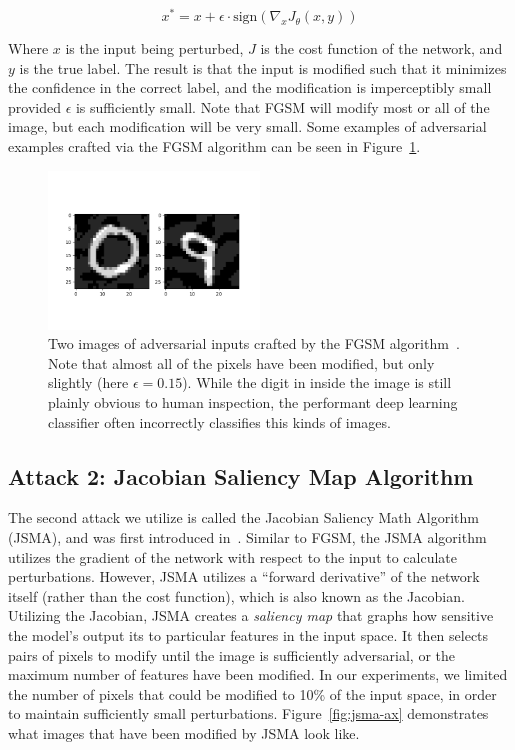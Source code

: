\documentclass{article}
\begin{document}
\begin{equation}
  x^* = x + \epsilon \cdot {\text{sign}}(\nabla_xJ_\theta(x, y))
\end{equation}

\noindent
Where $x$ is the input being perturbed, $J$ is the cost function of the network,
and $y$ is the true label. The result is that the input is modified such that it
minimizes the confidence in the correct label, and the modification is
imperceptibly small provided $\epsilon$ is sufficiently small. Note that FGSM
will modify most or all of the image, but each modification will be very small.
Some examples of adversarial examples crafted via the FGSM algorithm can be seen
in Figure~\ref{fig:fgsm-ax}.

\begin{figure}
  \includegraphics[width=0.5\textwidth]{fgsm}
  \caption{Two images of adversarial inputs crafted by the FGSM
    algorithm~\cite{goodfellow2014explaining}. Note
  that almost all of the pixels have been modified, but only slightly (here
$\epsilon = 0.15$). While the digit in inside the image is still plainly obvious
to human inspection, the performant deep learning classifier often incorrectly
classifies this kinds of images.}%
  \label{fig:fgsm-ax}
\end{figure}

\subsection{Attack 2: Jacobian Saliency Map Algorithm}

The second attack we utilize is called the Jacobian Saliency Math Algorithm
(JSMA), and was first introduced in~\cite{papernot2016limitations}. Similar to
FGSM, the JSMA algorithm utilizes the gradient of the network with respect to
the input to calculate perturbations. However, JSMA utilizes a ``forward
derivative'' of the network itself (rather than the cost function), which is
also known as the Jacobian. Utilizing the Jacobian, JSMA creates a
\textit{saliency map} that graphs how sensitive the model's output its to
particular features in the input space. It then selects pairs of pixels to
modify until the image is sufficiently adversarial, or the maximum number of
features have been modified. In our experiments, we limited the number of pixels
that could be modified to 10\% of the input space, in order to maintain
sufficiently small perturbations. Figure~\ref{fig:jsma-ax} demonstrates what
images that have been modified by JSMA look like.
\end{document}
